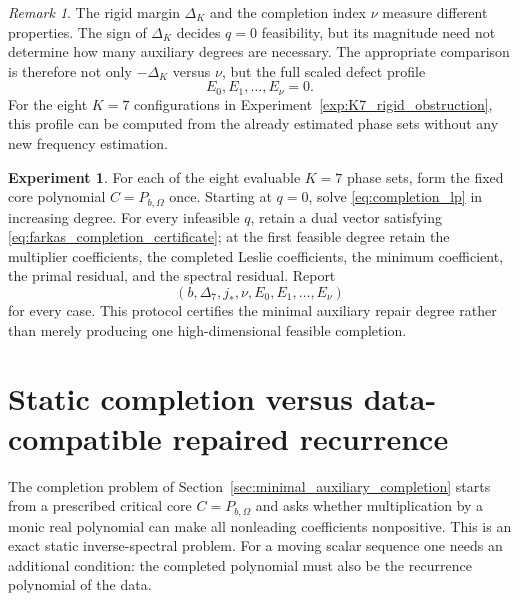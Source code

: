\documentclass[11pt]{amsart}
\numberwithin{equation}{section}
\theoremstyle{plain}
\theoremstyle{definition}
\newtheorem{experiment}[theorem]{Experiment}
\theoremstyle{remark}
\newtheorem{remark}[theorem]{Remark}
\begin{document}
\begin{remark}
\label{rem:delta_vs_nu}
The rigid margin $\Delta_K$ and the completion index $\nu$ measure different properties.  The sign of $\Delta_K$ decides $q=0$ feasibility, but its magnitude need not determine how many auxiliary degrees are necessary.  The appropriate comparison is therefore not only $-\Delta_K$ versus $\nu$, but the full scaled defect profile
\[
E_0,E_1,\ldots,E_{\nu}=0.
\]
For the eight $K=7$ configurations in Experiment~\ref{exp:K7_rigid_obstruction}, this profile can be computed from the already estimated phase sets without any new frequency estimation.
\end{remark}

\begin{experiment}
\label{exp:minimal_auxiliary_protocol}
For each of the eight evaluable $K=7$ phase sets, form the fixed core polynomial $C=P_{b,\Omega}$ once.  Starting at $q=0$, solve \eqref{eq:completion_lp} in increasing degree.  For every infeasible $q$, retain a dual vector satisfying \eqref{eq:farkas_completion_certificate}; at the first feasible degree retain the multiplier coefficients, the completed Leslie coefficients, the minimum coefficient, the primal residual, and the spectral residual.  Report
\[
(b,\Delta_7,j_*,\nu,E_0,E_1,\ldots,E_\nu)
\]
for every case.  This protocol certifies the minimal auxiliary repair degree rather than merely producing one high-dimensional feasible completion.
\end{experiment}



\section{Static completion versus data-compatible repaired recurrence}
\label{sec:data_compatible_repair}

The completion problem of Section~\ref{sec:minimal_auxiliary_completion} starts from a prescribed critical core $C=P_{b,\Omega}$ and asks whether multiplication by a monic real polynomial can make all nonleading coefficients nonpositive. This is an exact static inverse-spectral problem. For a moving scalar sequence one needs an additional condition: the completed polynomial must also be the recurrence polynomial of the data.
\end{document}
